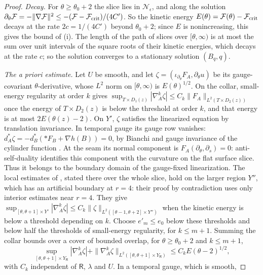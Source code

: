 \documentclass[11pt]{amsart}
\theoremstyle{definition}
\theoremstyle{remark}
\theoremstyle{plain}
\numberwithin{equation}{section}
\begin{document}
\begin{proof}
\emph{Decay.} For $\theta\ge\theta_0+2$ the slice lies in $\mathcal N_\epsilon$, and along the solution
$\partial_\theta\mathcal F=-\|\nabla\mathcal F\|^2\le-(\mathcal F-\mathcal F_{\rm crit})/(4C')$. So the kinetic energy
$E(\theta)=\mathcal F(\theta)-\mathcal F_{\rm crit}$ decays at the rate $2c=1/(4C')$ beyond $\theta_0+2$;
since $E$ is nonincreasing, this gives the bound of (i). The length of the path of slices over $[\theta,\infty)$ is at most the sum over
unit intervals of the square roots of their kinetic energies, which decays at the rate $c$;
so the solution converges to a stationary solution $(B_q,q)$.

\emph{The a priori estimate.} Let $U$ be smooth, and let $\zeta=(\iota_{\partial_\theta}F_A,\partial_\theta u)$
be its gauge-covariant $\theta$-derivative, whose $L^2$ norm on $[\theta,\infty)$ is $E(\theta)^{1/2}$.
On the collar, small-energy regularity at order $k$ gives
$\sup_{T\times D_1(z)}|\nabla^k_A\zeta|\le C_k\|F_A\|_{L^2(T\times D_2(z))}$ once the energy of $T\times D_2(z)$ is
below the threshold at order $k$, and that energy is at most $2E(\theta(z)-2)$. On $Y'$, $\zeta$
satisfies the linearized equation by translation invariance.
In temporal gauge its gauge row vanishes:
$d_A^*\zeta=-d_B^*(*F_B+\nabla h(B))=0$, by Bianchi and gauge
invariance of the cylinder function \cite[Proposition~2.10]{DFL}.
At the seam its normal component is $F_A(\partial_\theta,\partial_s)=0$:
anti-self-duality identifies this component with the curvature on
the flat surface slice. Thus it belongs to the boundary domain
of the gauge-fixed linearization. The local estimates of
\cite[Proposition~5.27 and Remark~4.19]{DFL}, stated there over the whole slice, hold
on the larger region $Y''$, which has an artificial boundary at $r=4$: their proof by
contradiction uses only interior estimates near $r=4$. They give
$\sup_{[\theta,\theta+1]\times Y'}|\nabla_A^k\zeta|
\le C_k\|\zeta\|_{L^2([\theta-1,\theta+2]\times Y'')}$
when the kinetic energy is below a threshold depending on $k$.
Choose $e'_m\le e_0$ below these
thresholds and below half the thresholds of small-energy regularity, for $k\le m+1$. Summing the collar bounds over a cover of bounded overlap, for
$\theta\ge\theta_0+2$ and $k\le m+1$,
\begin{equation}\label{eq:zeta-bounds}
\sup_{[\theta,\theta+1]\times Y_\mathsf R}|\nabla^k_A\zeta|+\|\nabla^k_A\zeta\|_{L^2([\theta,\theta+1]\times Y_\mathsf R)}\le C_kE(\theta-2)^{1/2},
\end{equation}
with $C_k$ independent of $\mathsf R$, $\lambda$ and $U$. In a temporal gauge, which is smooth,

\end{proof}
\end{document}
